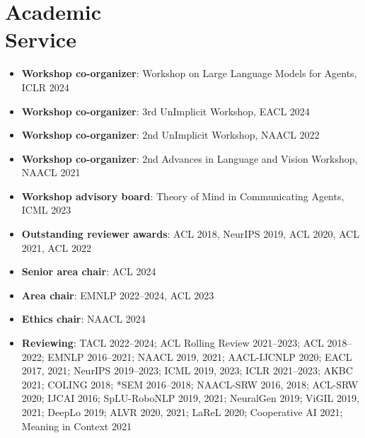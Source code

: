 \section{Academic \\ Service}
\begin{itemize}[leftmargin=-0.4mm,partopsep=0pt,label=]
  \item \textbf{Workshop co-organizer}: Workshop on Large Language Models for Agents, ICLR 2024

  \item \textbf{Workshop co-organizer}: 3rd UnImplicit Workshop, EACL 2024

  \item \textbf{Workshop co-organizer}: 2nd UnImplicit Workshop, NAACL 2022

  \item \textbf{Workshop co-organizer}: 2nd Advances in Language and Vision Workshop, NAACL 2021

  \item \textbf{Workshop advisory board}: Theory of Mind in Communicating Agents, ICML 2023

  \item \textbf{Outstanding reviewer awards}: ACL 2018, NeurIPS 2019, ACL 2020, ACL 2021, ACL 2022

  \item \textbf{Senior area chair}: ACL 2024

  \item \textbf{Area chair}: EMNLP 2022--2024, ACL 2023

  \item \textbf{Ethics chair}: NAACL 2024

  \item \textbf{Reviewing}: TACL 2022--2024; ACL Rolling Review 2021--2023; ACL 2018--2022; EMNLP 2016--2021; NAACL 2019, 2021; AACL-IJCNLP 2020; EACL 2017, 2021; NeurIPS 2019--2023; ICML 2019, 2023; ICLR 2021--2023; AKBC 2021; COLING 2018; *SEM 2016--2018; NAACL-SRW 2016, 2018; ACL-SRW 2020; IJCAI 2016; SpLU-RoboNLP 2019, 2021; NeuralGen 2019; ViGIL 2019, 2021; DeepLo 2019; ALVR 2020, 2021; LaReL 2020; Cooperative AI 2021; Meaning in Context 2021  \\






\end{itemize}

